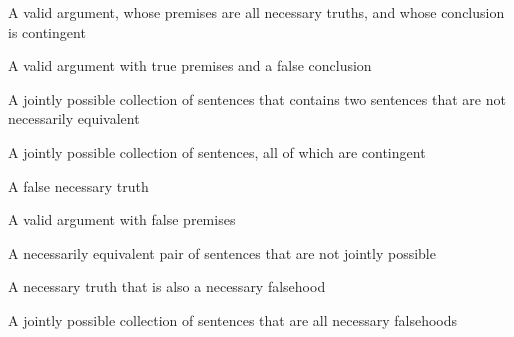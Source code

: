 \begin{earg}
\item A valid argument, whose premises are all necessary truths, and whose conclusion is contingent
\item A valid argument with true premises and a false conclusion
\item A jointly possible collection of sentences that contains two sentences that are not necessarily equivalent
\item A jointly possible collection of sentences, all of which are contingent
\item A false necessary truth
\item A valid argument with false premises
\item A necessarily equivalent pair of sentences that are not jointly possible
\item A necessary truth that is also a necessary falsehood
\item A jointly possible collection of sentences that are all necessary falsehoods
\end{earg}
